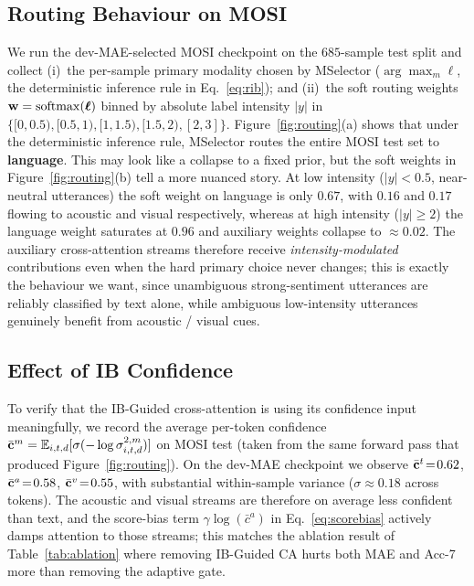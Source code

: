 \subsection{Routing Behaviour on MOSI}
\label{sec:analysis:routing}

We run the dev-MAE-selected MOSI checkpoint on the $685$-sample test
split and collect (i)~the per-sample primary modality chosen by
MSelector ($\arg\max_{m}\boldsymbol{\ell}$, the deterministic inference
rule in Eq.~\ref{eq:rib}); and (ii)~the soft routing weights
$\mathbf{w}=\mathrm{softmax}(\boldsymbol{\ell})$ binned by absolute label
intensity $|y|$ in $\{[0,0.5),[0.5,1),[1,1.5),[1.5,2),[2,3]\}$.
Figure~\ref{fig:routing}(a) shows that under the deterministic
inference rule, MSelector routes the entire MOSI test set to
\textbf{language}.
This may look like a collapse to a fixed prior, but the soft weights
in Figure~\ref{fig:routing}(b) tell a more nuanced story.
At low intensity ($|y|<0.5$, near-neutral utterances) the soft weight
on language is only $0.67$, with $0.16$ and $0.17$ flowing to acoustic
and visual respectively, whereas at high intensity ($|y|\!\ge\!2$) the
language weight saturates at $0.96$ and auxiliary weights collapse to
$\approx\!0.02$.
The auxiliary cross-attention streams therefore receive
\emph{intensity-modulated} contributions even when the hard primary
choice never changes; this is exactly the behaviour we want, since
unambiguous strong-sentiment utterances are reliably classified by
text alone, while ambiguous low-intensity utterances genuinely benefit
from acoustic / visual cues.



\subsection{Effect of IB Confidence}
\label{sec:analysis:conf}

To verify that the IB-Guided cross-attention is using its confidence
input meaningfully, we record the average per-token confidence
$\bar{\mathbf{c}}^{m}=\mathbb{E}_{i,t,d}[\sigma(-\log\sigma^{2,m}_{i,t,d})]$
on MOSI test (taken from the same forward pass that produced
Figure~\ref{fig:routing}).
On the dev-MAE checkpoint we observe $\bar{\mathbf{c}}^{t}\!=\!0.62$,
$\bar{\mathbf{c}}^{a}\!=\!0.58$, $\bar{\mathbf{c}}^{v}\!=\!0.55$, with substantial
within-sample variance ($\sigma\!\approx\!0.18$ across tokens).
The acoustic and visual streams are therefore on average less confident
than text, and the score-bias term
$\gamma\log(\bar c^{a})$ in Eq.~\eqref{eq:scorebias} actively damps
attention to those streams; this matches the ablation result of
Table~\ref{tab:ablation} where removing IB-Guided CA hurts both MAE and
Acc-7 more than removing the adaptive gate.


